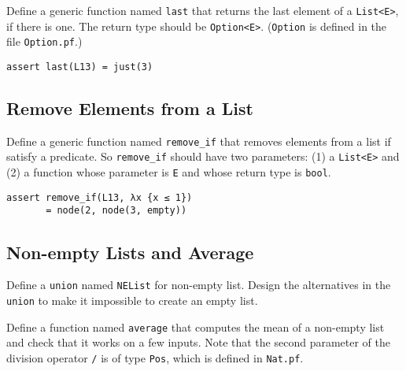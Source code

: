 \documentclass[12pt]{article}
\begin{document}
Define a generic function named \texttt{last} that returns the last element
of a \texttt{List<E>}, if there is one. The return type should be \texttt{Option<E>}.
(\texttt{Option} is defined in the file \texttt{Option.pf}.)

\begin{verbatim}
assert last(L13) = just(3)
\end{verbatim}

\subsection{Remove Elements from a List}

Define a generic function named \texttt{remove\_if} that removes elements
from a list if satisfy a predicate. So \texttt{remove\_if} should have two
parameters: (1) a \texttt{List<E>} and (2) a function whose parameter is \texttt{E} 
and whose return type is \texttt{bool}.

\begin{verbatim}
assert remove_if(L13, λx {x ≤ 1}) 
       = node(2, node(3, empty))
\end{verbatim}

\subsection{Non-empty Lists and Average}

Define a \texttt{union} named \texttt{NEList} for non-empty list.
Design the alternatives in the \texttt{union} to make it impossible to
create an empty list.

Define a function named \texttt{average} that computes the mean of a
non-empty list and check that it works on a few inputs.
Note that the second parameter of the division operator \texttt{/} 
is of type \texttt{Pos}, which is defined in \texttt{Nat.pf}.
\end{document}
